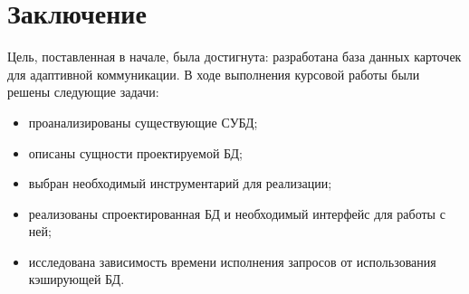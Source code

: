 \chapter*{Заключение}

Цель, поставленная в начале, была достигнута: разработана база данных карточек для адаптивной коммуникации. В ходе выполнения курсовой работы были решены следующие задачи:

\begin{itemize}
	\item проанализированы существующие СУБД;
	\item описаны сущности проектируемой БД;
	\item выбран необходимый инструментарий для реализации;
	\item реализованы спроектированная БД и необходимый интерфейс для работы с ней;
	\item исследована зависимость времени исполнения запросов от использования кэширующей БД.
\end{itemize}
